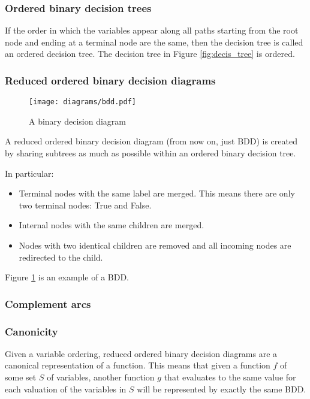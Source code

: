 \subsubsection{Ordered binary decision trees}

If the order in which the variables appear along all paths starting from the root node and ending at a terminal node are the same, then the decision tree is called an ordered decision tree. The decision tree in Figure \ref{fig:decis_tree} is ordered.

\subsubsection{Reduced ordered binary decision diagrams}

\begin{figure}[t]
\centering
\texttt{[image: diagrams/bdd.pdf]}
\caption{A binary decision diagram}
\label{fig:bdd}
\end{figure}

A reduced ordered binary decision diagram (from now on, just BDD) is created by sharing subtrees as much as possible within an ordered binary decision tree.

In particular: 
\begin{itemize}
    \item Terminal nodes with the same label are merged. This means there are only two terminal nodes: True and False.
    \item Internal nodes with the same children are merged.
    \item Nodes with two identical children are removed and all incoming nodes are redirected to the child.
\end{itemize}

Figure \ref{fig:bdd} is an example of a BDD.

\subsubsection{Complement arcs}

\subsubsection{Canonicity}
Given a variable ordering, reduced ordered binary decision diagrams are a canonical representation of a function. This means that given a function $f$ of some set $S$ of variables, another function $g$ that evaluates to the same value for each valuation of the variables in $S$ will be represented by exactly the same BDD.

